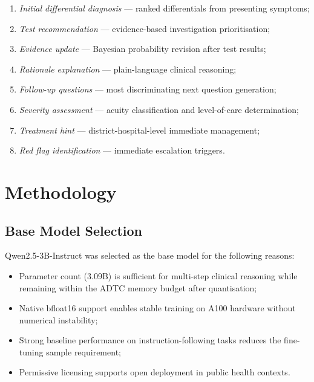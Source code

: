 \documentclass[journal]{IEEEtran}
\begin{document}
\begin{enumerate}
  \item \textit{Initial differential diagnosis} --- ranked
        differentials from presenting symptoms;
  \item \textit{Test recommendation} --- evidence-based
        investigation prioritisation;
  \item \textit{Evidence update} --- Bayesian probability revision
        after test results;
  \item \textit{Rationale explanation} --- plain-language clinical
        reasoning;
  \item \textit{Follow-up questions} --- most discriminating next
        question generation;
  \item \textit{Severity assessment} --- acuity classification and
        level-of-care determination;
  \item \textit{Treatment hint} --- district-hospital-level
        immediate management;
  \item \textit{Red flag identification} --- immediate
        escalation triggers.
\end{enumerate}

\section{Methodology}
\label{sec:method}

\subsection{Base Model Selection}

Qwen2.5-3B-Instruct \cite{qwen2025} was selected as the base model
for the following reasons:
\begin{itemize}
  \item Parameter count (3.09B) is sufficient for multi-step clinical
        reasoning while remaining within the ADTC memory budget after
        quantisation;
  \item Native bfloat16 support enables stable training on A100
        hardware without numerical instability;
  \item Strong baseline performance on instruction-following tasks
        reduces the fine-tuning sample requirement;
  \item Permissive licensing supports open deployment in public
        health contexts.
\end{itemize}
\end{document}
